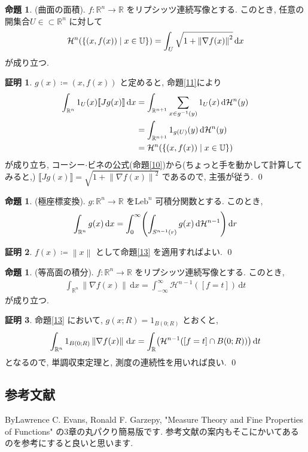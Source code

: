 \documentclass[twocolumn, landscape, a4paper , 8pt, fleqn, titlepage ]{jsarticle}
\theoremstyle{definition}
\newtheorem{prop}[dfn]{命題}
\newtheorem*{pf*}{証明}
\newcommand{\paren}[1]{\mleft( #1\mright )}
\newcommand{\cbra}[1]{\mleft\{#1\mright\}}
\newcommand{\norm}[1]{\left\|#1\right\|}
\newcommand{\dbra}[1]{\llbracket #1 \rrbracket}
\newcommand{\Leb}{\textrm{Leb}}
\renewcommand{\d}{\, \textrm{d} }
\renewcommand{\-}{\hyphen}
\begin{document}
\begin{prop}(曲面の面積).
$f: \mathbb R^n \rightarrow \mathbb R$ をリプシッツ連続写像とする. このとき, 任意の開集合$U \in \subset \mathbb R^n$ に対して
\begin{align*} \mathcal H^n (\cbra{(x, f(x)) \mid x \in \mathbb U}) = \int_U \sqrt{1 + \norm{\nabla f(x)}^2 } \d x \end{align*}
が成り立つ.
\end{prop}
\begin{pf*}
$g(x) \coloneqq  (x, f(x))$ と定めると,  命題\ref{11}により
\begin{align*} \int_{\mathbb R^n}1_U(x) \dbra{Jg(x)} \d x &= \int_{\mathbb R^{n+1}} \sum_{x \in g^{-1} (y)} 1_U (x) \d \mathcal H^n(y) \\&= \int_{\mathbb R^{n+1}} 1_{g(U)} (y) \d \mathcal H^n(y)  \\&= \mathcal H^n (\cbra{(x, f(x)) \mid x \in \mathbb U})  \end{align*}
が成り立ち, コーシー$\cdot$ビネの公式(命題\ref{10})から(ちょっと手を動かして計算してみると,) $\dbra{Jg(x)} = \sqrt {1+ \norm{\nabla f(x)} ^2}$ であるので, 主張が従う. 
\qed
\end{pf*}

\begin{prop}(極座標変換).
$g:\mathbb R^n \rightarrow \mathbb R$ を$\Leb^n$ 可積分関数とする. このとき, 
\begin{align*} \int_{\mathbb R^n} g(x) \d x = \int_0^\infty \paren{\int_{S^{n-1}(r)} g(x) \d \mathcal H^{n-1} } \d r \end{align*}
\end{prop}
\begin{pf*}
$f(x) \coloneqq  \norm x $ として命題\ref{13} を適用すればよい. 
\qed
\end{pf*}

\begin{prop}(等高面の積分).
$f: \mathbb R^n \rightarrow \mathbb R$ をリプシッツ連続写像とする. このとき, 
\begin{align*} \int_{\mathbb R^n} \norm{\nabla f (x) } \d x = \int_{-\infty}^\infty \mathcal H^{n-1} ([f = t]) \d t \end{align*}
が成り立つ. 
\end{prop}
\begin{pf*}
命題\ref{13} において, $g(x;R) = 1_{B(0;R)}$ とおくと, 
\begin{align*} \int_{\mathbb R^n} 1_{B(0;R)} \norm{\nabla f (x)} \d x = \int_{\mathbb R} \paren{ \mathcal H ^{n-1} ([f=t] \cap B(0;R))} \d t \end{align*}
となるので, 単調収束定理と, 測度の連続性を用いれば良い. 
\qed
\end{pf*}


\subsection{参考文献}

ByLawrence C. Evans, Ronald F. Garzepy, "Measure Theory and Fine Properties of Functions" の3章の丸パクり簡易版です. 参考文献の案内もそこにかいてあるのを参考にすると良いと思います. 
\end{document}
